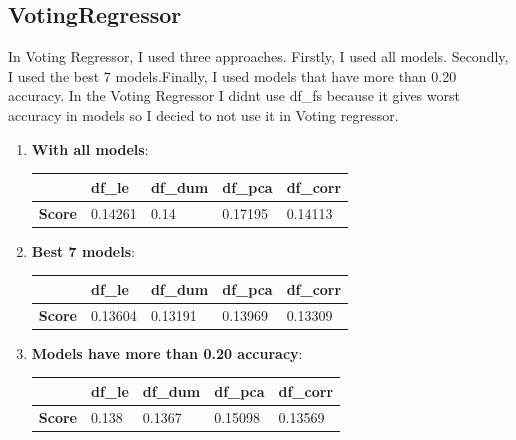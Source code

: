 \subsection{VotingRegressor}
 In Voting Regressor, I used three approaches. Firstly, I used all models. Secondly, I used the best 7 models.Finally, I used models that have more than 0.20 accuracy. In the Voting Regressor I didnt use df\_fs because it gives worst accuracy in models so I decied to not use it in Voting regressor.\newline
\begin{enumerate}[]
  \item \textbf{With all models}: 
\begin{table}[H]
\begin{tabular}{l|l|l|l|l|}
\cline{2-5}
                                     & \textbf{df\_le} & \textbf{df\_dum} & \textbf{df\_pca} & \textbf{df\_corr} \\ \hline
\multicolumn{1}{|l|}{\textbf{Score}} & 0.14261         & 0.14           & 0.17195          & 0.14113           \\ \hline
\end{tabular}
\end{table}



  \item \textbf{Best 7 models}: 
\begin{table}[H]
\begin{tabular}{l|l|l|l|l|}
\cline{2-5}
                                     & \textbf{df\_le} & \textbf{df\_dum} & \textbf{df\_pca} & \textbf{df\_corr} \\ \hline
\multicolumn{1}{|l|}{\textbf{Score}} & 0.13604         & 0.13191           & 0.13969          & 0.13309           \\ \hline
\end{tabular}
\end{table}
  \item \textbf{Models have more than 0.20 accuracy}: 

\begin{table}[H]
\begin{tabular}{l|l|l|l|l|}
\cline{2-5}
                                     & \textbf{df\_le} & \textbf{df\_dum} & \textbf{df\_pca} & \textbf{df\_corr} \\ \hline
\multicolumn{1}{|l|}{\textbf{Score}} & 0.138         & 0.1367           & 0.15098          & 0.13569           \\ \hline
\end{tabular}
\end{table}
\end{enumerate}
